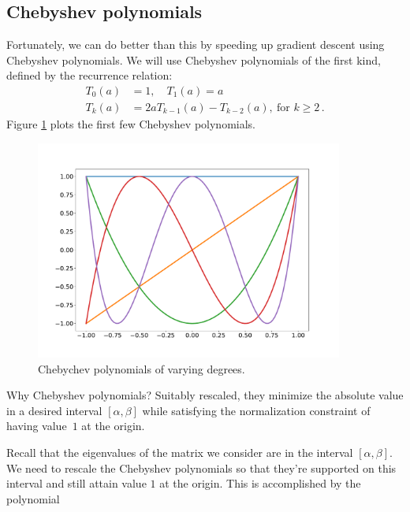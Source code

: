 \subsection{Chebyshev polynomials}
%
Fortunately, we can do better than this by speeding up gradient descent using
Chebyshev polynomials. We will use Chebyshev polynomials of the first kind,
defined by the recurrence relation:
\begin{align*}
T_0(a) &= 1,\quad T_1(a) = a \\
T_k(a) &= 2a T_{k-1}(a) - T_{k-2}(a),\ \text{for }k \geq 2\,.
\end{align*}
Figure \ref{chebychev_poly} plots the first few Chebyshev polynomials.

\begin{figure}[ht]
\includegraphics[width=0.9\textwidth]{figures/lecture6-cheb_polynome.pdf}
\centering
\caption{Chebychev polynomials of varying degrees.}
\label{chebychev_poly}
\end{figure}

Why Chebyshev polynomials? Suitably rescaled, they minimize the absolute value
in a desired interval $[\alpha, \beta]$ while satisfying the normalization
constraint of having value~$1$ at the origin.

Recall that the eigenvalues of the matrix we consider are in the interval $[\alpha, \beta]$. We need to rescale the Chebyshev polynomials so that they're supported on this interval and still attain value $1$ at the origin. This is accomplished by the polynomial

